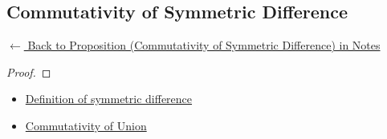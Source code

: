 
\subsection*{Commutativity of Symmetric Difference}
\label{prf:symmdiff-comm}

\begin{remark*}[Return]
\hyperref[prop:symmdiff-comm]{$\leftarrow$ Back to Proposition (Commutativity of Symmetric Difference) in Notes}
\end{remark*}

\begin{proof}
\end{proof}

\begin{remark*}

\end{remark*}

\begin{remark*}[Dependencies]
\begin{itemize}
  \item \hyperref[def:set-operations]{Definition of symmetric difference}
  \item \hyperref[prop:comm-union]{Commutativity of Union}
\end{itemize}

\end{remark*}
